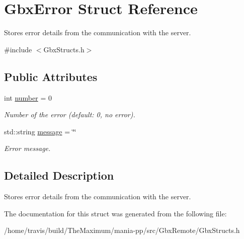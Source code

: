 \hypertarget{structGbxError}{\section{Gbx\-Error Struct Reference}
\label{structGbxError}
}


Stores error details from the communication with the server.  




{\ttfamily \#include $<$Gbx\-Structs.\-h$>$}

\subsection*{Public Attributes}
\begin{DoxyCompactItemize}
\item 
\hypertarget{structGbxError_ae5627cae63e837beaa75f798e47be50e}{int \hyperlink{structGbxError_ae5627cae63e837beaa75f798e47be50e}{number} = 0}\label{structGbxError_ae5627cae63e837beaa75f798e47be50e}

\begin{DoxyCompactList}\small\item\em Number of the error (default\-: 0, no error). \end{DoxyCompactList}\item 
\hypertarget{structGbxError_af52353692b5c160deac99c4285f01a5a}{std\-::string \hyperlink{structGbxError_af52353692b5c160deac99c4285f01a5a}{message} = \char`\"{}\char`\"{}}\label{structGbxError_af52353692b5c160deac99c4285f01a5a}

\begin{DoxyCompactList}\small\item\em Error message. \end{DoxyCompactList}\end{DoxyCompactItemize}


\subsection{Detailed Description}
Stores error details from the communication with the server. 

The documentation for this struct was generated from the following file\-:\begin{DoxyCompactItemize}
\item 
/home/travis/build/\-The\-Maximum/mania-\/pp/src/\-Gbx\-Remote/Gbx\-Structs.\-h\end{DoxyCompactItemize}
